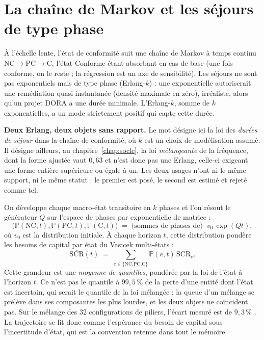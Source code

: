 \section{La chaîne de Markov et les séjours de type phase}

À l'échelle lente, l'état de conformité suit une chaîne de Markov à temps continu
$\text{NC}\to\text{PC}\to\text{C}$, l'état Conforme étant absorbant en cas de base
(une fois conforme, on le reste ; la régression est un axe de sensibilité). Les séjours ne sont
pas exponentiels mais de type phase (Erlang-$k$) : une exponentielle autoriserait une
remédiation quasi instantanée (densité maximale en zéro), irréaliste, alors qu'un projet DORA a
une durée minimale. L'Erlang-$k$, somme de $k$ exponentielles, a un mode strictement positif qui
capte cette durée.

\begin{attention}
\textbf{Deux Erlang, deux objets sans rapport.} Le mot désigne ici la loi des \emph{durées de
séjour} dans la chaîne de conformité, où $k$ est un choix de modélisation assumé. Il désigne
ailleurs, au chapitre~\ref{chap:socle}, la loi \emph{mélangeante} de la fréquence, dont la
forme ajustée vaut $0{,}63$ et n'est donc pas une Erlang, celle-ci exigeant une forme
entière supérieure ou égale à un. Les deux usages n'ont ni le même support, ni le même statut :
le premier est posé, le second est estimé et rejeté comme tel.
\end{attention} On développe chaque macro-état transitoire en $k$ phases et l'on résout le
générateur $Q$ sur l'espace de phases par exponentielle de matrice :
\begin{equation}
\big(\mathbb P(\text{NC},t),\mathbb P(\text{PC},t),\mathbb P(\text{C},t)\big)
\;=\; \text{(sommes de phases de)}\;\; v_0\,\exp(Qt),
\end{equation}
où $v_0$ est la distribution initiale. À chaque horizon $t$, cette distribution pondère les
besoins de capital par état du Vasicek multi-états :
\begin{equation}
\overline{\mathrm{SCR}}(t)\;=\;\sum_{e\in\{\text{NC,PC,C}\}}\mathbb P(e,t)\,\mathrm{SCR}_e .
\end{equation}
Cette grandeur est une \emph{moyenne de quantiles}, pondérée par la loi de l'état à l'horizon
$t$. Ce n'est pas le quantile à $99{,}5\,\%$ de la perte d'une entité dont l'état est incertain,
qui serait le quantile de la loi mélangée : la queue d'un mélange se prélève dans ses composantes
les plus lourdes, et les deux objets ne coïncident pas. Sur le mélange des $32$ configurations de
piliers, l'écart mesuré est de $9{,}3\,\%$ \matcomp. La
trajectoire se lit donc comme l'espérance du besoin de capital sous l'incertitude d'état, qui est
la convention retenue dans tout le mémoire.

